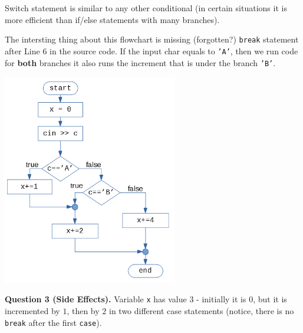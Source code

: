 \documentclass[11pt]{article}
\begin{document}
Switch statement is similar to any other conditional (in certain 
situations it is more efficient than if/else statements with many branches). 

The intersting thing about this flowchart is missing (forgotten?) {\tt break}
statement after Line 6 in the source code. If the input char equals to {\tt 'A'}, 
then we run code for {\bf both} branches \textendash 
it also runs the increment that is under the branch {\tt 'B'}. 

\includegraphics[width=3in]{assignment01-expr-control/assignment01-flowchart.png}

\vspace{20pt}
{\bf Question 3 (Side Effects).} Variable {\tt x} 
has value $3$ - initially it is $0$, but it is incremented by $1$, then by $2$
in two different case statements (notice, there is no {\tt break} after the 
first {\tt case}).
\end{document}
